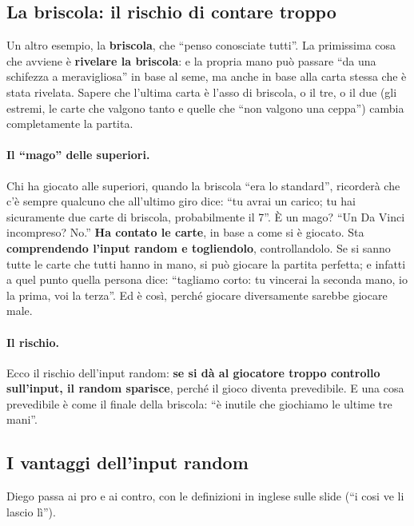 \subsection{La briscola: il rischio di contare troppo}

Un altro esempio, la \textbf{briscola}, che ``penso conosciate tutti''. La primissima cosa che
avviene è \textbf{rivelare la briscola}: e la propria mano può passare ``da una schifezza a
meravigliosa'' in base al seme, ma anche in base alla carta stessa che è stata rivelata. Sapere
che l'ultima carta è l'asso di briscola, o il tre, o il due (gli estremi, le carte che valgono
tanto e quelle che ``non valgono una ceppa'') cambia completamente la partita.

\paragraph{Il ``mago'' delle superiori.} Chi ha giocato alle superiori, quando la briscola
``era lo standard'', ricorderà che c'è sempre qualcuno che all'ultimo giro dice: ``tu avrai
un carico; tu hai sicuramente due carte di briscola, probabilmente il 7''. È un mago? ``Un Da
Vinci incompreso? No.'' \textbf{Ha contato le carte}, in base a come si è giocato. Sta
\textbf{comprendendo l'input random e togliendolo}, controllandolo. Se si sanno tutte le carte
che tutti hanno in mano, si può giocare la partita perfetta; e infatti a quel punto quella
persona dice: ``tagliamo corto: tu vincerai la seconda mano, io la prima, voi la terza''. Ed è
così, perché giocare diversamente sarebbe giocare male.

\paragraph{Il rischio.} Ecco il rischio dell'input random: \textbf{se si dà al giocatore
troppo controllo sull'input, il random sparisce}, perché il gioco diventa prevedibile. E una
cosa prevedibile è come il finale della briscola: ``è inutile che giochiamo le ultime tre
mani''.

\subsection{I vantaggi dell'input random}

Diego passa ai pro e ai contro, con le definizioni in inglese sulle slide (``i cosi ve li
lascio lì'').

